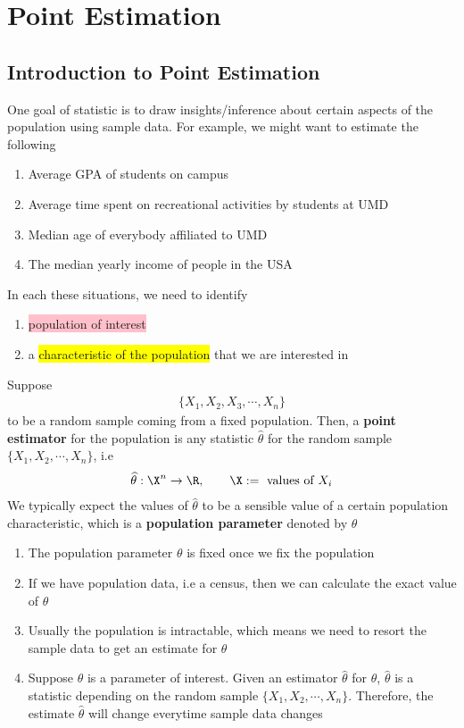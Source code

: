 \chapter[Point Estimation]{Point Estimation}
\section[Introduction to Point Estimation]{Introduction to Point Estimation}
One goal of statistic is to draw insights/inference about certain aspects of the population using sample data. For example, we might want to estimate the following \begin{enumerate}
\item Average GPA of students on campus
\item Average time spent on recreational activities by students at UMD
\item Median age of everybody affiliated to UMD
\item The median yearly income of people in the USA
\end{enumerate}
In each these situations, we need to identify\begin{enumerate}
\item \colorbox{pink}{population of interest}
\item a \colorbox{yellow}{characteristic of the population} that we are interested in
\end{enumerate}
\begin{defn}
Suppose \begin{align*}
\{X_1,X_2,X_3,\cdots,X_n\}
\end{align*}
to be a random sample coming from a fixed population. Then, a \textbf{point estimator} for the population is any statistic $\widehat{\theta}$ for the random sample $\{X_1,X_2,\cdots,X_n\}$, i.e \begin{align*}
\widehat{\theta}:\X^n\to \R,\text{\qquad}\X:=\text{ values of }X_i
\end{align*}
We typically expect the values of $\widehat{\theta}$ to be a sensible value of a certain population characteristic, which is a \textbf{population parameter} denoted by $\theta$
\end{defn}
\note \begin{enumerate}
\item The population parameter $\theta$ is fixed once we fix the population
\item If we have population data, i.e a census, then we can calculate the exact value of $\theta$
\item Usually the population is intractable, which means we need to resort the sample data to get an estimate for $\theta$
\item Suppose $\theta$ is a parameter of interest. Given an estimator $\widehat{\theta}$ for $\theta$, $\widehat{\theta}$ is a statistic depending on the random sample $\{X_1,X_2,\cdots,X_n\}$. Therefore, the estimate $\widehat{\theta}$ will change everytime sample data changes
\end{enumerate}
